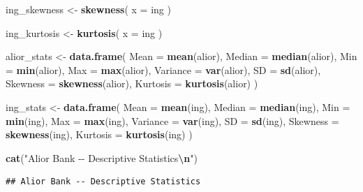 \documentclass[
]{article}
\newenvironment{Shaded}{\begin{snugshade}}{\end{snugshade}}
\newcommand{\AttributeTok}[1]{\textcolor[rgb]{0.13,0.29,0.53}{#1}}
\newcommand{\FunctionTok}[1]{\textcolor[rgb]{0.13,0.29,0.53}{\textbf{#1}}}
\newcommand{\NormalTok}[1]{#1}
\newcommand{\OtherTok}[1]{\textcolor[rgb]{0.56,0.35,0.01}{#1}}
\newcommand{\SpecialCharTok}[1]{\textcolor[rgb]{0.81,0.36,0.00}{\textbf{#1}}}
\newcommand{\StringTok}[1]{\textcolor[rgb]{0.31,0.60,0.02}{#1}}
\begin{document}
\begin{Shaded}
\begin{Highlighting}[]
\NormalTok{ing\_skewness }\OtherTok{\textless{}{-}} \FunctionTok{skewness}\NormalTok{(}
  \AttributeTok{x =}\NormalTok{ ing}
\NormalTok{)}

\NormalTok{ing\_kurtosis }\OtherTok{\textless{}{-}} \FunctionTok{kurtosis}\NormalTok{(}
  \AttributeTok{x =}\NormalTok{ ing}
\NormalTok{)}
\end{Highlighting}
\end{Shaded}

\begin{Shaded}
\begin{Highlighting}[]
\NormalTok{alior\_stats }\OtherTok{\textless{}{-}} \FunctionTok{data.frame}\NormalTok{(}
  \AttributeTok{Mean =} \FunctionTok{mean}\NormalTok{(alior),}
  \AttributeTok{Median =} \FunctionTok{median}\NormalTok{(alior),}
  \AttributeTok{Min =} \FunctionTok{min}\NormalTok{(alior),}
  \AttributeTok{Max =} \FunctionTok{max}\NormalTok{(alior),}
  \AttributeTok{Variance =} \FunctionTok{var}\NormalTok{(alior),}
  \AttributeTok{SD =} \FunctionTok{sd}\NormalTok{(alior),}
  \AttributeTok{Skewness =} \FunctionTok{skewness}\NormalTok{(alior),}
  \AttributeTok{Kurtosis =} \FunctionTok{kurtosis}\NormalTok{(alior)}
\NormalTok{)}

\NormalTok{ing\_stats }\OtherTok{\textless{}{-}} \FunctionTok{data.frame}\NormalTok{(}
  \AttributeTok{Mean =} \FunctionTok{mean}\NormalTok{(ing),}
  \AttributeTok{Median =} \FunctionTok{median}\NormalTok{(ing),}
  \AttributeTok{Min =} \FunctionTok{min}\NormalTok{(ing),}
  \AttributeTok{Max =} \FunctionTok{max}\NormalTok{(ing),}
  \AttributeTok{Variance =} \FunctionTok{var}\NormalTok{(ing),}
  \AttributeTok{SD =} \FunctionTok{sd}\NormalTok{(ing),}
  \AttributeTok{Skewness =} \FunctionTok{skewness}\NormalTok{(ing),}
  \AttributeTok{Kurtosis =} \FunctionTok{kurtosis}\NormalTok{(ing)}
\NormalTok{)}
\end{Highlighting}
\end{Shaded}

\begin{Shaded}
\begin{Highlighting}[]
\FunctionTok{cat}\NormalTok{(}\StringTok{"Alior Bank {-}{-} Descriptive Statistics}\SpecialCharTok{\textbackslash{}n}\StringTok{"}\NormalTok{)}
\end{Highlighting}
\end{Shaded}

\begin{verbatim}
## Alior Bank -- Descriptive Statistics
\end{verbatim}
\end{document}
